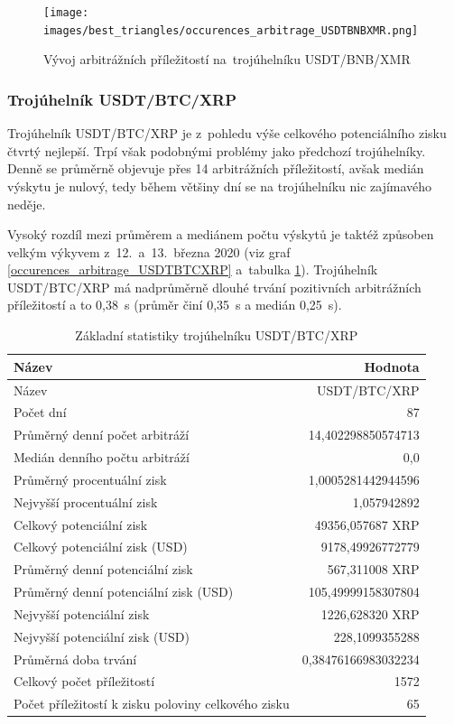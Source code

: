 \documentclass[thesis=B,czech]{FITthesis}[2019/03/21]
\begin{document}
\begin{figure}\centering
	\texttt{[image: images/best\_triangles/occurences\_arbitrage\_USDTBNBXMR.png]}
	\caption{Vývoj arbitrážních příležitostí na~trojúhelníku USDT/BNB/XMR }\label{occurences_arbitrage_USDTBNBXMR}
\end{figure}

\subsubsection{Trojúhelník USDT/BTC/XRP}
Trojúhelník USDT/BTC/XRP je z~pohledu výše celkového potenciálního zisku čtvrtý nejlepší. Trpí však podobnými problémy jako předchozí trojúhelníky. Denně se průměrně objevuje přes 14 arbitrážních příležitostí, avšak medián výskytu je nulový, tedy během většiny dní se na trojúhelníku nic zajímavého neděje. 

Vysoký rozdíl mezi průměrem a mediánem počtu výskytů je taktéž způsoben velkým výkyvem z~12.~a~13.~března 2020 (viz graf \ref{occurences_arbitrage_USDTBTCXRP} a~tabulka \ref{USDTBTCXRP_stats}). Trojúhelník USDT/BTC/XRP má nadprůměrně dlouhé trvání pozitivních arbitrážních příležitostí a to 0,38~s (průměr činí 0,35~s a medián 0,25~s).

\begin{table}\centering
\caption{Základní statistiky trojúhelníku USDT/BTC/XRP}
\label{USDTBTCXRP_stats}
\begin{tabular}{|| l | r ||}
\hline Název & Hodnota \\ 
\hline\hline Název & USDT/BTC/XRP \\ 
\hline Počet dní & 87 \\ 
\hline Průměrný denní počet arbitráží & 14,402298850574713 \\ 
\hline Medián denního počtu arbitráží & 0,0 \\ 
\hline Průměrný procentuální zisk & 1,0005281442944596 \\ 
\hline Nejvyšší procentuální zisk & 1,057942892 \\ 
\hline Celkový potenciální zisk & 49356,057687 XRP \\ 
\hline Celkový potenciální zisk (USD) & 9178,49926772779 \\ 
\hline Průměrný denní potenciální zisk & 567,311008 XRP \\ 
\hline Průměrný denní potenciální zisk (USD) & 105,49999158307804 \\ 
\hline Nejvyšší potenciální zisk & 1226,628320 XRP \\ 
\hline Nejvyšší potenciální zisk (USD) & 228,1099355288 \\ 
\hline Průměrná doba trvání & 0,38476166983032234 \\ 
\hline Celkový počet příležitostí & 1572 \\ 
\hline Počet příležitostí k zisku poloviny celkového zisku & 65 \\ 
\hline
\end{tabular}
\end{table}
\end{document}
